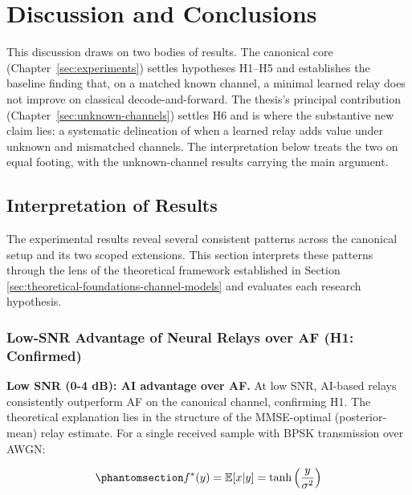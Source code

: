 \chapter{Discussion and Conclusions}\label{sec:discussion-and-conclusions}

This discussion draws on two bodies of results. The canonical core (Chapter~\ref{sec:experiments}) settles hypotheses H1--H5 and establishes the baseline finding that, on a matched known channel, a minimal learned relay does not improve on classical decode-and-forward. The thesis's principal contribution (Chapter~\ref{sec:unknown-channels}) settles H6 and is where the substantive new claim lies: a systematic delineation of when a learned relay adds value under unknown and mismatched channels. The interpretation below treats the two on equal footing, with the unknown-channel results carrying the main argument.

\section{Interpretation of Results}\label{sec:interpretation-of-results}

The experimental results reveal several consistent patterns across the canonical setup and its two scoped extensions. This section interprets these patterns through the lens of the theoretical framework established in Section \ref{sec:theoretical-foundations-channel-models}  and evaluates each research hypothesis.

\subsection{Low-SNR Advantage of Neural Relays over AF (H1: Confirmed)}\label{sec:low-snr-advantage-of-neural-relays-h1-confirmed}

\textbf{Low SNR (0-4 dB): AI advantage over AF.} At low SNR, AI-based relays consistently outperform AF on the canonical channel, confirming H1. The theoretical explanation lies in the structure of the MMSE-optimal (posterior-mean) relay estimate. For a single received sample with BPSK transmission over AWGN:

\begin{equation}\protect\phantomsection\label{eq:optimal-denoiser-relay}{f^*(y) = \mathbb{E}[x | y] = \tanh\left(\frac{y}{\sigma^2}\right)
}\end{equation}

